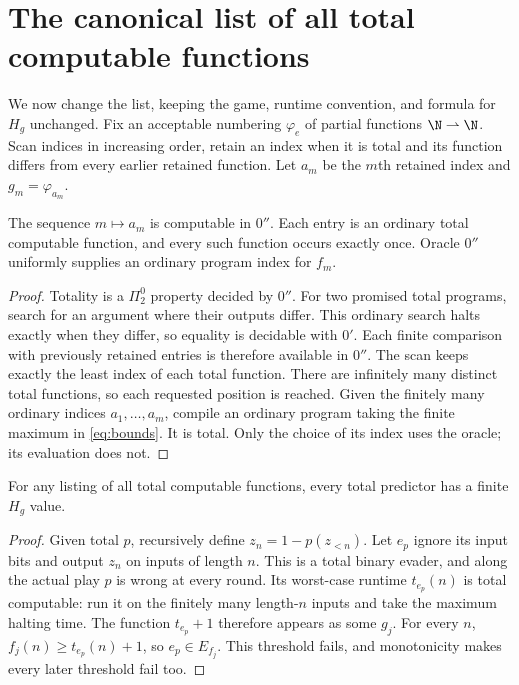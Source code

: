 \documentclass[11pt]{article}
\begin{document}
\section{The canonical list of all total computable functions}

We now change the list, keeping the game, runtime convention, and
formula for $H_g$ unchanged. Fix an acceptable numbering $\varphi_e$
of partial functions $\N\rightharpoonup\N$. Scan indices in increasing
order, retain an index when it is total and its function differs
from every earlier retained function. Let $a_m$ be the $m$th
retained index and $g_m=\varphi_{a_m}$.

\begin{lemma}\label{lem:list}
The sequence $m\mapsto a_m$ is computable in $0''$. Each entry is
an ordinary total computable function, and every such function
occurs exactly once. Oracle $0''$ uniformly supplies an ordinary
program index for $f_m$.
\end{lemma}
\begin{proof}
Totality is a $\Pi^0_2$ property decided by $0''$. For two promised
total programs, search for an argument where their outputs differ.
This ordinary search halts exactly when they differ, so equality
is decidable with $0'$. Each finite comparison with previously
retained entries is therefore available in $0''$.
The scan keeps exactly the least index of each total function.
There are infinitely many distinct total functions, so each
requested position is reached. Given the finitely many ordinary
indices $a_1,\ldots,a_m$, compile an ordinary program taking the
finite maximum in \eqref{eq:bounds}. It is total. Only the choice
of its index uses the oracle; its evaluation does not.
\end{proof}

\begin{lemma}\label{lem:finitevalues}
For any listing of all total computable functions, every total
predictor has a finite $H_g$ value.
\end{lemma}
\begin{proof}
Given total $p$, recursively define $z_n=1-p(z_{<n})$.
Let $e_p$ ignore its input bits and output $z_n$ on inputs of length
$n$. This is a total binary evader, and along the actual play $p$
is wrong at every round. Its worst-case runtime $t_{e_p}(n)$ is
total computable: run it on the finitely many length-$n$ inputs
and take the maximum halting time. The function $t_{e_p}+1$
therefore appears as some $g_j$. For every $n$,
$f_j(n)\ge t_{e_p}(n)+1$, so $e_p\in E_{f_j}$. This threshold
fails, and monotonicity makes every later threshold fail too.
\end{proof}
\end{document}
